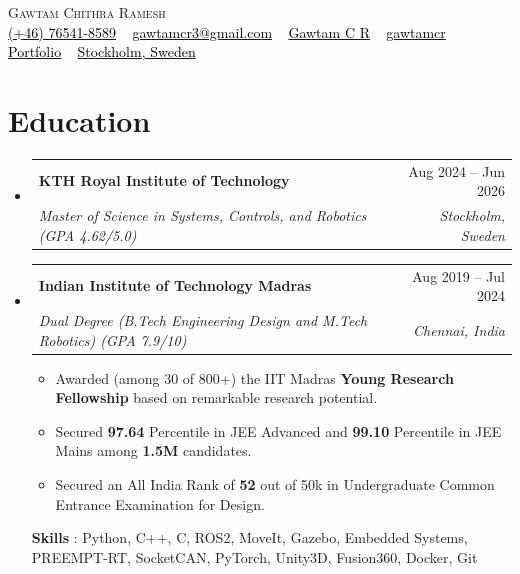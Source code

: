 \documentclass[letterpaper, 11pt]{article}
\makeatletter
\newcommand{\resumeSubheading}[4]{
\vspace{-2pt}
\item
\begin{tabular*}{1.0\textwidth}[t]{l@{\extracolsep{\fill}}r}
	\textbf{#1}       & {\small #2} \\
     [-2pt]
	\textit{{\small#3}} & \textit{\small #4} \\
\end{tabular*}
\vspace{-10pt}
}
\newcommand{\resumeSubHeadingListStart}{\begin{itemize}[leftmargin=0.0in, label={}]}
\newcommand{\resumeSubHeadingListEnd}{\end{itemize}\vspace{-1em}}
\makeatother
\begin{document}
\begin{center}
    {\Huge \scshape Gawtam Chithra Ramesh} \\
    \vspace{3pt}
    \small
    { \href{tel:+46764518589}{{\faMobile*} \textcolor{black}{(+46) 76541-8589}} ~
    \href{mailto:gawtamcr3@gmail.com}{{\faPaperPlane} \textcolor{black}{gawtamcr3@gmail.com}} ~
    \href{https://linkedin.com/in/gawtamcr/}{{\faLinkedinIn} \textcolor{black}{Gawtam C R}} ~
    \href{https://github.com/gawtamcr}{{\faGithub} \textcolor{black}{gawtamcr}} ~
    \href{https://gawtamcr.github.io/}{{\faGlobe} \textcolor{black}{Portfolio}} ~
    \href{https://maps.google.com/?q=Stockholm,Sweden}{{\faMapMarker*} \textcolor{black}{Stockholm, Sweden}}
    }
    \vspace{-8pt}
\end{center}

\section{\color{Blue}Education}
    \resumeSubHeadingListStart
    \resumeSubheading{KTH Royal Institute of Technology}{Aug 2024 -- Jun 2026}{Master of Science in Systems, Controls, and Robotics \textnormal{(GPA 4.62/5.0)}}{Stockholm, Sweden}
    \resumeSubheading{Indian Institute of Technology Madras}{Aug 2019 -- Jul 2024}{Dual Degree (B.Tech Engineering Design and M.Tech Robotics) \textnormal{(GPA 7.9/10)}}{Chennai, India}
    \vspace{-0.3em}
    \small{
    \begin{itemize}[leftmargin=0.15in]
        \setlength{\itemsep}{-0.3em}
        \item Awarded (among 30 of 800+) the IIT Madras \textbf{Young Research Fellowship} based on remarkable research potential.
        \item Secured \textbf{97.64} Percentile in JEE Advanced and \textbf{99.10} Percentile in JEE Mains among \textbf{1.5M} candidates.
        \item Secured an All India Rank of \textbf{52} out of 50k in Undergraduate Common Entrance Examination for Design.
    \end{itemize}
    }
    \vspace{-0.7em}
    \textbf{Skills} : Python, C++, C, ROS2, MoveIt, Gazebo, Embedded Systems, PREEMPT-RT, SocketCAN, PyTorch, Unity3D, Fusion360, Docker, Git
    \resumeSubHeadingListEnd
\end{document}
